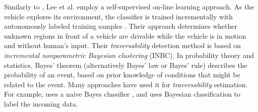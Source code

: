 \documentclass[12pt,a4paper]{report}
\newcommand{\etal}[1]{#1 et al.}
\newcommand{\term}{\textit}
\newcommand{\acronym}{\MakeUppercase}
\begin{document}
	Similarly to \cite{Kim}, \etal{Lee} employ a self-supervised on-line learning 
	approach. As the vehicle explores its environment, the classifier is trained 
	incrementally with autonomously labeled training samples \cite{Lee}. Their 
	approach determines whether unknown regions in front of a vehicle are drivable 
	while the vehicle is in motion and without human’s input. Their 
	\term{traversability} detection method is based on \term{incremental 
	nonparametric Bayesian clustering} (\acronym{inbc}). In probability theory and 
	statistics, Bayes' theorem (alternatively Bayes' law or Bayes' rule) describes 
	the probability of an event, based on prior knowledge of conditions that might 
	be related to the event. Many approaches have used it for \term{traversability} 
	estimation. For example, \cite{Suger} uses a naive Bayes classifier \cite{Denis}, 
	and \cite{Lalonde} uses Bayesian classification to label the incoming data.
	\\
	
\end{document}
